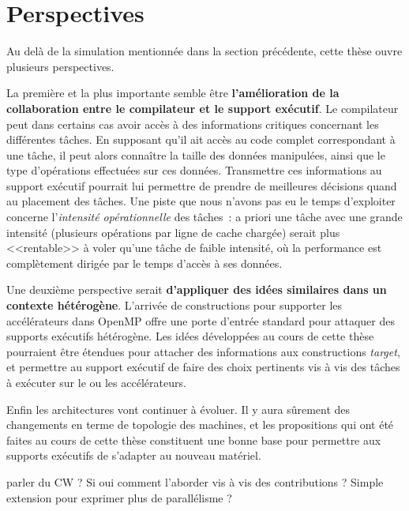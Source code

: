 \section*{Perspectives}

Au delà de la simulation mentionnée dans la section précédente, cette thèse ouvre plusieurs perspectives.

La première et la plus importante semble être \textbf{l'amélioration de la collaboration entre le compilateur et le support exécutif}.
Le compilateur peut dans certains cas avoir accès à des informations critiques concernant les différentes tâches.
En supposant qu'il ait accès au code complet correspondant à une tâche, il peut alors connaître la taille des données manipulées, ainsi que le type d'opérations effectuées sur ces données.
Transmettre ces informations au support exécutif pourrait lui permettre de prendre de meilleures décisions quand au placement des tâches.
Une piste que nous n'avons pas eu le temps d'exploiter concerne l'\emph{intensité opérationnelle} des tâches~: a priori une tâche avec une grande intensité (plusieurs opérations par ligne de cache chargée) serait plus <<rentable>> à voler qu'une tâche de faible intensité, où la performance est complètement dirigée par le temps d'accès à ses données.

Une deuxième perspective serait \textbf{d'appliquer des idées similaires dans un contexte hétérogène}.
L'arrivée de constructions pour supporter les accélérateurs dans OpenMP offre une porte d'entrée standard pour attaquer des supports exécutifs hétérogène.
Les idées développées au cours de cette thèse pourraient être étendues pour attacher des informations aux constructions \emph{target}, et permettre au support exécutif de faire des choix pertinents vis à vis des tâches à exécuter sur le ou les accélérateurs.

Enfin les architectures vont continuer à évoluer. Il y aura sûrement des changements en terme de topologie des machines, et les propositions qui ont été faites au cours de cette thèse constituent une bonne base pour permettre aux supports exécutifs de s'adapter au nouveau matériel.

\begin{todo}
  parler du CW ? Si oui comment l'aborder vis à vis des contributions ?
  Simple extension pour exprimer plus de parallélisme ?
\end{todo}
